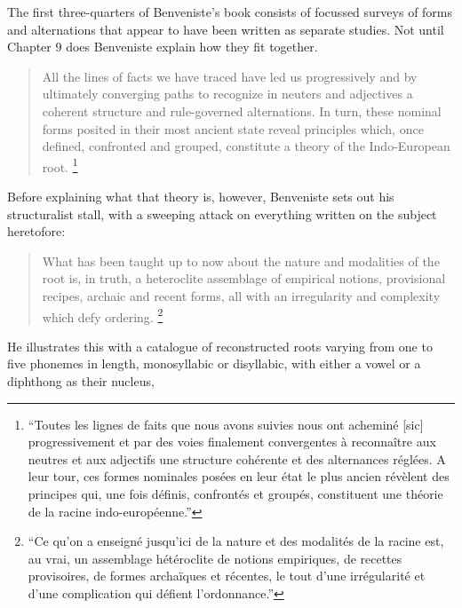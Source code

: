 \documentclass[output=paper]{langscibook}
\begin{document}
The first three-quarters of Benveniste's book consists of focussed surveys of forms and alternations that appear to have been written as separate studies. Not until Chapter 9 does Benveniste explain how they fit together.

\begin{quotation}
All the lines of facts we have traced have led us progressively and by ultimately converging paths to recognize in neuters and adjectives a coherent structure and rule-governed alternations. In turn, these nominal forms posited in their most ancient state reveal principles which, once defined, confronted and grouped, constitute a theory of the Indo-European root. \citep[147]{Benveniste1935}\footnote{``Toutes les lignes de faits que nous avons suivies nous ont acheminé [sic] progressivement et par des voies finalement convergentes à reconnaître aux neutres et aux adjectifs une structure cohérente et des alternances réglées. A leur tour, ces formes nominales posées en leur état le plus ancien révèlent des principes qui, une fois définis, confrontés et groupés, constituent une théorie de la racine indo-européenne.''}
\end{quotation}

Before explaining what that theory is, however, Benveniste sets out his structuralist stall, with a sweeping attack on everything written on the subject heretofore:

\begin{quotation}
What has been taught up to now about the nature and modalities of the root is, in truth, a heteroclite assemblage of empirical notions, provisional recipes, archaic and recent forms, all with an irregularity and complexity which defy ordering. \citep[147]{Benveniste1935}\footnote{``Ce qu'on a enseigné jusqu'ici de la nature et des modalités de la racine est, au vrai, un assemblage hétéroclite de notions empiriques, de recettes provisoires, de formes archaïques et récentes, le tout d’une irrégularité et d’une complication qui défient l’ordonnance.''}
\end{quotation}

He illustrates this with a catalogue of reconstructed roots varying from one to five phonemes in length, monosyllabic or disyllabic, with either a vowel or a diphthong as their nucleus, 
\end{document}
